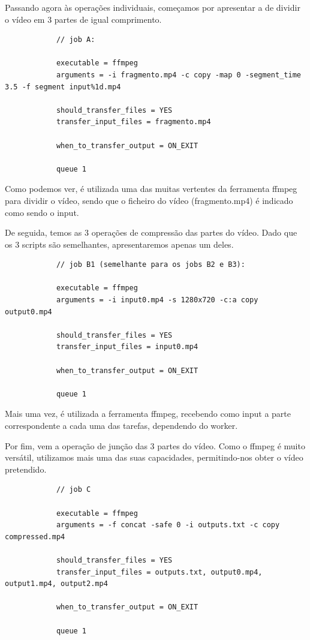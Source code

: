 \documentclass[a4paper]{report}
\begin{document}
	Passando agora às operações individuais, começamos por apresentar a de dividir o vídeo em 3 partes de igual comprimento.
	
	\small{
		\begin{verbatim}
			// job A:

			executable = ffmpeg
			arguments = -i fragmento.mp4 -c copy -map 0 -segment_time 3.5 -f segment input%1d.mp4
	
			should_transfer_files = YES
			transfer_input_files = fragmento.mp4
	
			when_to_transfer_output = ON_EXIT
	
			queue 1
		\end{verbatim}
	}
	\large{
		Como podemos ver, é utilizada uma das muitas vertentes da ferramenta ffmpeg para dividir o vídeo, sendo que o ficheiro do vídeo (fragmento.mp4) é indicado como sendo o input.
		
		De seguida, temos as 3 operações de compressão das partes do vídeo. Dado que os 3 scripts são semelhantes, apresentaremos apenas um deles.
	}

	\small{
		\begin{verbatim}
			// job B1 (semelhante para os jobs B2 e B3):

			executable = ffmpeg
			arguments = -i input0.mp4 -s 1280x720 -c:a copy output0.mp4

			should_transfer_files = YES
			transfer_input_files = input0.mp4

			when_to_transfer_output = ON_EXIT

			queue 1
		\end{verbatim}
	}
	
	\large{
		Mais uma vez, é utilizada a ferramenta ffmpeg, recebendo como input a parte correspondente a cada uma das tarefas, dependendo do worker.
		
		Por fim, vem a operação de junção das 3 partes do vídeo. Como o ffmpeg é muito versátil, utilizamos mais uma das suas capacidades, permitindo-nos obter o vídeo pretendido.
	}
	
	\small{
		\begin{verbatim}
			// job C

			executable = ffmpeg
			arguments = -f concat -safe 0 -i outputs.txt -c copy compressed.mp4

			should_transfer_files = YES
			transfer_input_files = outputs.txt, output0.mp4, output1.mp4, output2.mp4

			when_to_transfer_output = ON_EXIT

			queue 1
		\end{verbatim}
	}
	
\end{document}
